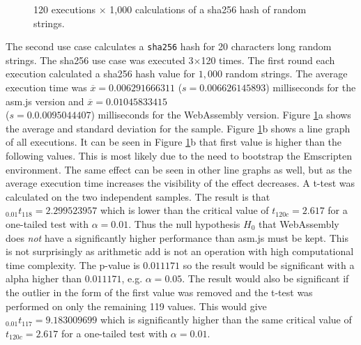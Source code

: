 \begin{figure}[!h]%
\centering
{}%
{}%
\caption{120 executions $\times$ 1,000 calculations of a sha256 hash of random strings.}%
\label{sha256-hash-1000-1}%
\end{figure}
    
The second use case calculates a \texttt{sha256} hash for 20 characters long random strings. The sha256 use case was executed 3$\times$120 times. The first round each execution calculated a sha256 hash value for $1,000$ random strings. The average execution time was $\overline{x}=0.006291666311$ ($s=0.006626145893$) milliseconds for the asm.js version and $\overline{x}=0.01045833415$ \\ ($s=0.0.0095044407$) milliseconds for the WebAssembly version. Figure \ref{sha256-hash-1000-1}a shows the average and standard deviation for the sample. Figure \ref{sha256-hash-1000-1}b shows a line graph of all executions. It can be seen in Figure \ref{sha256-hash-1000-1}b that first value is higher than the following values. This is most likely due to the need to bootstrap the Emscripten environment. The same effect can be seen in other line graphs as well, but as the average execution time increases the visibility of the effect decreases. A t-test was calculated on the two independent samples. The result is that $_{0.01}t_{118}=2.299523957$ which is lower than the critical value of $t_{120c}=2.617$ for a one-tailed test with $\alpha = 0.01$. Thus the null hypothesis $H_{0}$ that WebAssembly does \emph{not} have a significantly higher performance than asm.js must be kept. This is not surprisingly as arithmetic add is not an operation with high computational time complexity. The p-value is $0.011171$ so the result would be significant with a alpha higher than $0.011171$, e.g. $\alpha = 0.05$. The result would also be significant if the outlier in the form of the first value was removed and the t-test was performed on only the remaining 119 values. This would give $_{0.01}t_{117}=9.183009699$ which is significantly higher than the same critical value of $t_{120c}=2.617$ for a one-tailed test with $\alpha = 0.01$. 

